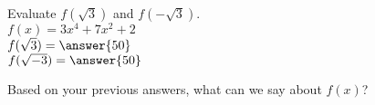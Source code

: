 \documentclass{ximera}
\author{David Kish}
\begin{document}
\begin{exercise}
Evaluate $f(\sqrt{3})$ and $f(-\sqrt{3})$.\\
$f(x)= 3x^4+7x^2+ 2$\\
$f(\sqrt{3})=\answer{50}$\\
$f(\sqrt{-3})=\answer{50}$
\end{exercise}
\begin{exercise}
Based on your previous answers, what can we say about $f(x)$?
\begin{multipleChoice}
\end{multipleChoice}
\end{exercise}
\end{document}
